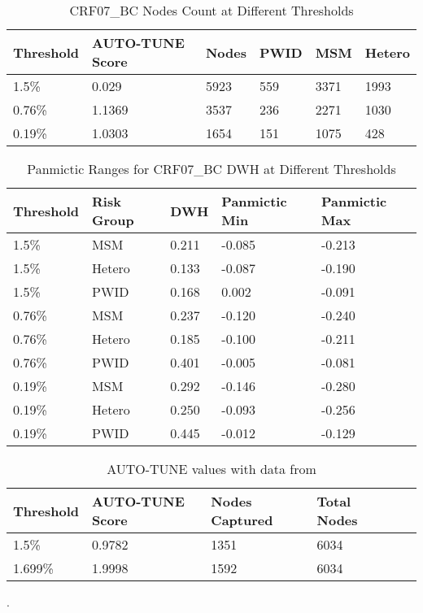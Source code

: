 \documentclass[utf8]{FrontiersinHarvard} %
\begin{document}
\begin{table}[h!]
	\centering
	\begin{tabularx}{\textwidth}{|X|X|X|X|X|X|}
		\hline
		Threshold & AUTO-TUNE Score & Nodes & PWID & MSM  & Hetero \\
		\hline
		1.5\%     & 0.029           & 5923  & 559  & 3371 & 1993   \\
		0.76\%    & 1.1369          & 3537  & 236  & 2271 & 1030   \\
		0.19\%    & 1.0303          & 1654  & 151  & 1075 & 428    \\
		\hline
	\end{tabularx}
	\caption{CRF07\_BC Nodes Count at Different Thresholds}
	\label{table:combined}
\end{table}

\begin{table}[h!]
	\centering
	\begin{tabularx}{\textwidth}{|X|X|X|X|X|}
		\hline
		Threshold & Risk Group & DWH   & Panmictic Min & Panmictic Max \\
		\hline
		1.5\%     & MSM        & 0.211 & -0.085        & -0.213        \\
		1.5\%     & Hetero     & 0.133 & -0.087        & -0.190        \\
		1.5\%     & PWID       & 0.168 & 0.002         & -0.091        \\
		\hline
		0.76\%    & MSM        & 0.237 & -0.120        & -0.240        \\
		0.76\%    & Hetero     & 0.185 & -0.100        & -0.211        \\
		0.76\%    & PWID       & 0.401 & -0.005        & -0.081        \\
		\hline
		0.19\%    & MSM        & 0.292 & -0.146        & -0.280        \\
		0.19\%    & Hetero     & 0.250 & -0.093        & -0.256        \\
		0.19\%    & PWID       & 0.445 & -0.012        & -0.129        \\
		\hline
	\end{tabularx}
	\caption{Panmictic Ranges for CRF07\_BC DWH at Different Thresholds}
	\label{table:panmictic}
\end{table}

\begin{table}[h!]
	\centering
	\begin{tabularx}{\textwidth}{|X|X|X|X|X|X|}
		\hline
		Threshold & AUTO-TUNE Score & Nodes Captured & Total Nodes \\
		\hline
		1.5\%     & 0.9782          & 1351           & 6034        \\
		1.699\%   & 1.9998          & 1592           & 6034        \\
		\hline
	\end{tabularx}
	\caption{AUTO-TUNE values with data from \cite{rhee_national_2019}}.
	\label{table:rhee}
\end{table}
\end{document}

